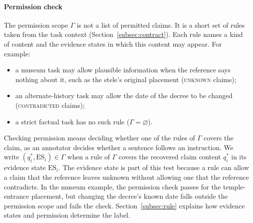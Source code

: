 \documentclass{clv2025}
\begin{document}
\paragraph{Permission check}
The permission scope $\Gamma$ is not a list of permitted claims. It is a
short set of rules taken from the task context
(Section~\ref{subsec:contract}). Each rule names a kind of content and the
evidence states in which this content may appear. For example:
\begin{itemize}
\item a museum task may allow plausible information when the reference
says nothing about it, such as the stele's original placement
(\textsc{unknown} claims);
\item an alternate-history task may allow the date of the decree to be
changed (\textsc{contradicted} claims);
\item a strict factual task has no such rule ($\Gamma=\varnothing$).
\end{itemize}
Checking permission means deciding whether one of the rules of $\Gamma$
covers the claim, as an annotator decides whether a sentence follows an
instruction. We write $(q^*_i,\mathrm{ES}_i)\in\Gamma$ when a rule of
$\Gamma$ covers the recovered claim content $q^*_i$ in its evidence state
$\mathrm{ES}_i$. The evidence state is part of this test because a rule can allow a claim that
the reference leaves unknown without allowing one that the reference
contradicts. In the museum example, the permission check passes for the
temple-entrance placement, but changing the decree's known date falls
outside the permission scope and fails the check.
Section~\ref{subsec:rule} explains how evidence states and permission determine the label.
\end{document}

